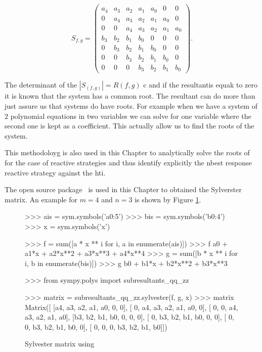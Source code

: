 \begin{equation}
S_{f,g} = \begin{pmatrix} a_{4} & a_{3} & a_{2} & a_{1} & a_{0} & 0     & 0    \\
                          0     & a_{4} & a_{3} & a_{2} & a_{1} & a_{0} & 0    \\
                          0     & 0     & a_{4} & a_{3} & a_{2} & a_{1} & a_{0} \\
                          b_{3} & b_{2} & b_{1} & b_{0} &     0 & 0     & 0     \\
                          0     & b_{3} & b_{2} & b_{1} & b_{0} & 0     & 0     \\
                          0     & 0     & b_{3} & b_{2} & b_{1} & b_{0} & 0     \\
                          0     & 0     & 0     & b_{3} & b_{2} & b_{1} & b_{0}
                        \end{pmatrix}.
\end{equation}

The determinant of the \(|S_(f, g)| = R(f, g)\) c and if the resultantis equak to zero it is known
that the system has a common root.
The resultant can do more than just assure us that systems do have roots. For
example when we have a system of 2 polynomial equations in two variables we can
solve for one variable where the second one is kept as a coefficient. This
actually allow us to find the roots of the system.

This methodoloyg is also
used in this Chapter to analytically solve the roots of for the case
of reactive strategies and thus identify explicitly the nbest response reactive
strategy against the hti.

The open source package~\cite{sympy} is used in this Chapter to obtained the
Sylverster matrix. An example for \(m = 4\) and \(n = 3\) is shown by Figure
\ref{figure:code_for_sylvester}.

\begin{figure}
\begin{usagepy}
>>> ais = sym.symbols('a0:5')
>>> bis = sym.symbols('b0:4')
>>> x  = sym.symbols('x')

>>> f = sum([a * x ** i for i, a in enumerate(ais)])
>>> f
a0 + a1*x + a2*x**2 + a3*x**3 + a4*x**4
>>> g = sum([b * x ** i for i, b in enumerate(bis)])
>>> g
b0 + b1*x + b2*x**2 + b3*x**3

>>> from sympy.polys import subresultants_qq_zz

>>> matrix = subresultants_qq_zz.sylvester(f, g, x)
>>> matrix
Matrix([
[a4, a3, a2, a1, a0,  0,  0],
[ 0, a4, a3, a2, a1, a0,  0],
[ 0,  0, a4, a3, a2, a1, a0],
[b3, b2, b1, b0,  0,  0,  0],
[ 0, b3, b2, b1, b0,  0,  0],
[ 0,  0, b3, b2, b1, b0,  0],
[ 0,  0,  0, b3, b2, b1, b0]])
\end{usagepy}
\caption{Sylvester matrix using~\cite{sympy}}\label{figure:code_for_sylvester}
\end{figure}

